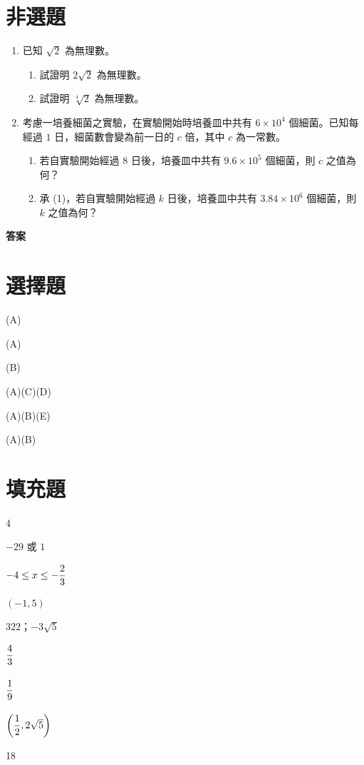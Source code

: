 \documentclass[12pt]{article}
\newcommand*{\fraction}[2]{\rule[-.8\baselineskip]{0pt}{2\baselineskip}\dfrac{#1}{#2}}
\begin{document}
\section{非選題}
\begin{enumerate}[align=left,leftmargin=*,labelsep=.6em,parsep=0ex]
  \item 已知 $\sqrt{2}$ 為無理數。
  \begin{enumerate}[label=(\arabic*),align=left,leftmargin=*,labelsep=.4em]
    \item 試證明 $2\sqrt{2}$ 為無理數。
    \item 試證明 $\sqrt[4]{2}$ 為無理數。
  \end{enumerate}
  \item 考慮一培養細菌之實驗，在實驗開始時培養皿中共有 $6 \times 10^4$ 個細菌。已知每經過 $1$ 日，細菌數會變為前一日的 $c$ 倍，其中 $c$ 為一常數。
  \begin{enumerate}[label=(\arabic*),align=left,leftmargin=*,labelsep=.4em]
    \item 若自實驗開始經過 8 日後，培養皿中共有 $9.6 \times 10^5$ 個細菌，則 $c$ 之值為何？
    \item 承 (1)，若自實驗開始經過 $k$ 日後，培養皿中共有 $3.84 \times 10^6$ 個細菌，則 $k$ 之值為何？
  \end{enumerate}
\end{enumerate}

\newpage
{\bfseries\large 答案 \par}
\section*{選擇題}
\begin{enumerate*}[label=\arabic*.,itemjoin=\tab]
  \item (A)
  \item (A)
  \item (B)
  \item (A)(C)(D)
  \item (A)(B)(E)
  \item (A)(B)
\end{enumerate*}
\section*{填充題}
\begin{enumerate*}[label=\Alph*.,itemjoin=\tab]
  \item 4
  \item $-29$ 或 $1$
  \item $-4 \leq x \leq -\fraction{2}{3}$
  \item $(-1,5)$
  \item $322$；$-3\sqrt{5}$
  \item $\fraction{4}{3}$
  \item $\fraction{1}{9}$
  \item $\biggl(\fraction{1}{2}, 2\sqrt{5}\biggr)$
  \item 18
\end{enumerate*}
\end{document}
